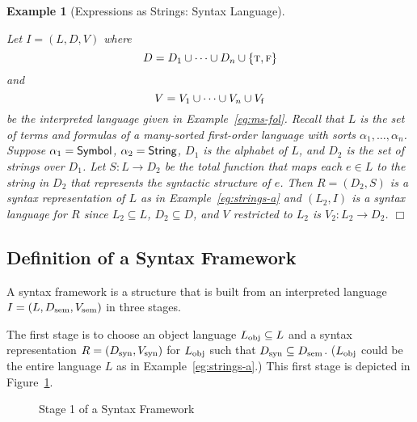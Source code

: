 \documentclass[11pt,fleqn]{article}
\newcommand{\bsp}{\begin{sloppypar}}
\newcommand{\esp}{\end{sloppypar}}
\newcommand{\set}[1]{{\{ #1 \}}}
\newcommand{\mname}[1]{\mbox{\sf #1}}
\newcommand{\tarrow}{\rightarrow}
\newcommand{\TRUE}{\mbox{{\sc t}}}
\newcommand{\FALSE}{\mbox{{\sc f}}}
\newtheorem{eg}[thm]{Example}
\begin{document}
\begin{eg}[Expressions as Strings: Syntax Language] \label{eg:strings-b} \em
\bsp Let $I= (L, D, V)$ where \[D = D_1 \cup \cdots \cup D_n \cup
\set{\TRUE,\FALSE}\] and \[V = V_1 \cup \cdots \cup V_n \cup V_{\rm
  f}\] be the interpreted language given in Example~\ref{eg:ms-fol}.
Recall that $L$ is the set of terms and formulas of a many-sorted
first-order language with sorts $\alpha_1,\ldots,\alpha_n$.  Suppose
$\alpha_1 = \mname{Symbol}$, $\alpha_2 = \mname{String}$, $D_1$ is the
alphabet of $L$, and $D_2$ is the set of strings over $D_1$.  Let $S :
L \tarrow D_2$ be the total function that maps each $e \in L$ to the
string in $D_2$ that represents the syntactic structure of $e$.  Then
$R= (D_2,S)$ is a syntax representation of $L$ as in
Example~\ref{eg:strings-a} and $(L_2,I)$ is a syntax language for $R$
since $L_2 \subseteq L$, $D_2 \subseteq D$, and $V$ restricted to
$L_2$ is $V_2 : L_2 \tarrow D_2$. \hfill $\Box$ \esp
\end{eg}

\subsection{Definition of a Syntax Framework} \label{subsec:frameworks}

A syntax framework is a structure that is built from an interpreted
language $I = (L,D_{\rm sem},V_{\rm sem})$ in three stages.  

The first stage is to choose an object language $L_{\rm obj} \subseteq
L$ and a syntax representation $R=(D_{\rm syn},V_{\rm syn})$ for
$L_{\rm obj}$ such that $D_{\rm syn} \subseteq D_{\rm sem}$.  ($L_{\rm
  obj}$ could be the entire language $L$ as in
Example~\ref{eg:strings-a}.)  This first stage is depicted in
Figure~\ref{fig:syn-frame-stage-1}.

\begin{figure}
\center
{}
\caption{Stage 1 of a Syntax Framework}  \label{fig:syn-frame-stage-1}
\end{figure}
\end{document}
